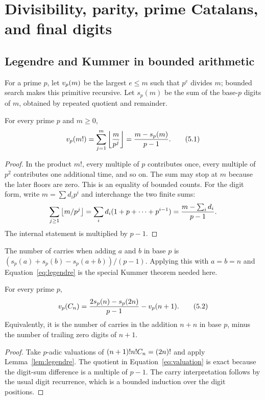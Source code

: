 \section{Divisibility, parity, prime Catalans, and final digits}
\label{sec:number-theory}

\subsection{Legendre and Kummer in bounded arithmetic}

For a prime $p$, let $v_{p}(m)$ be the largest $e\le m$ such that $p^e$ divides
$m$; bounded search makes this primitive recursive.  Let $s_p(m)$ be the sum
of the base-$p$ digits of $m$, obtained by repeated quotient and remainder.

\begin{lemma}[Legendre]
\label{lem:legendre}
For every prime $p$ and $m\ge0$,
\[
 v_{p}(m!)=\sum_{j=1}^{m}\left\lfloor \frac{m}{p^j}\right\rfloor
          =\frac{m-s_p(m)}{p-1}.                                 \tag{5.1}\label{eq:legendre}
\]
\end{lemma}

\begin{proof}
In the product $m!$, every multiple of $p$ contributes once, every multiple of
$p^2$ contributes one additional time, and so on.  The sum may stop at $m$
because the later floors are zero.  This is an equality of bounded counts.
For the digit form, write $m=\sum d_ip^i$ and interchange the two finite sums:
\[
 \sum_{j\ge1}\left\lfloor m/p^j\right\rfloor
 =\sum_i d_i(1+p+\cdots+p^{i-1})
 =\frac{m-\sum_i d_i}{p-1}.
\]
The internal statement is multiplied by $p-1$.
\end{proof}

The number of carries when adding $a$ and $b$ in base $p$ is
\((s_p(a)+s_p(b)-s_p(a+b))/(p-1)\).  Applying this with $a=b=n$ and
Equation~\eqref{eq:legendre} is the special Kummer theorem needed here.

\begin{theorem}
\label{thm:valuation}
For every prime $p$,
\[
 v_{p}(C_n)
 =\frac{2s_p(n)-s_p(2n)}{p-1}-v_{p}(n+1).                        \tag{5.2}\label{eq:valuation}
\]
Equivalently, it is the number of carries in the addition $n+n$ in base $p$,
minus the number of trailing zero digits of $n+1$.
\end{theorem}

\begin{proof}
Take $p$-adic valuations of
$(n+1)!n!C_n=(2n)!$ and apply Lemma~\ref{lem:legendre}.  The quotient in
Equation~\eqref{eq:valuation} is exact because the digit-sum difference is a
multiple of $p-1$.  The carry interpretation follows by the usual digit
recurrence, which is a bounded induction over the digit positions.
\end{proof}

